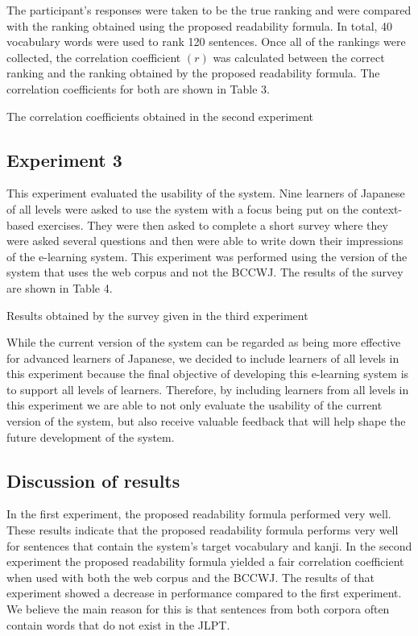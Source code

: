 \documentclass[english]{jnlp_1.4}
\begin{document}
The participant's responses were taken to be the true ranking and were compared with the ranking obtained using the proposed readability formula. In total, 40 vocabulary words were used to rank 120 sentences. Once all of the rankings were collected, the correlation coefficient $(r)$ was calculated between the correct ranking and the ranking obtained by the proposed readability formula. The correlation coefficients for both are shown in Table 3.

\begin{table}[b]
  \caption{The correlation coefficients obtained in the second experiment}
  \label{table3}

\end{table}


\subsection{Experiment 3}

This experiment evaluated the usability of the system. Nine learners of Japanese of all levels were asked to use the system with a focus being put on the context-based exercises. They were then asked to complete a short survey where they were asked several questions and then were able to write down their impressions of the e-learning system. This experiment was performed using the version of the system that uses the web corpus and not the BCCWJ. The results of the survey are shown in Table 4.

\begin{table}[t]
  \caption{Results obtained by the survey given in the third experiment}
  \label{table4}

\end{table}

While the current version of the system can be regarded as being more effective for advanced learners of Japanese, we decided to include learners of all levels in this experiment because the final objective of developing this e-learning system is to support all levels of learners. Therefore, by including learners from all levels in this experiment we are able to not only evaluate the usability of the current version of the system, but also receive valuable feedback that will help shape the future development of the system.


\subsection{Discussion of results}

In the first experiment, the proposed readability formula performed very well. These results indicate that the proposed readability formula performs very well for sentences that contain the system's target vocabulary and kanji. In the second experiment the proposed readability formula yielded a fair correlation coefficient when used with both the web corpus and the BCCWJ. The results of that experiment showed a decrease in performance compared to the first experiment. We believe the main reason for this is that sentences from both corpora often contain words that do not exist in the JLPT.
\end{document}
